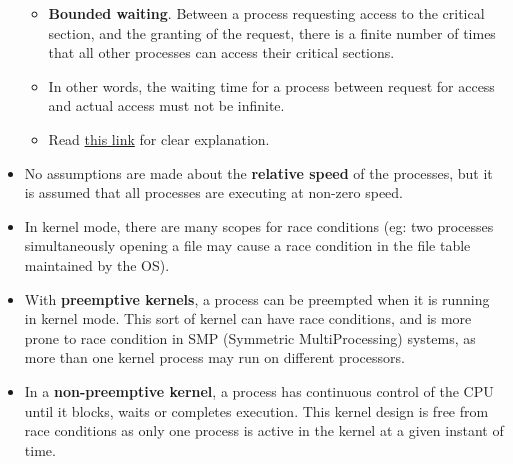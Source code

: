 \documentclass{article}
\theoremstyle{plain}
\theoremstyle{definition}
\begin{document}
\begin{itemize}
\begin{itemize}
        \item \textbf{Bounded waiting}. Between a process requesting access to the critical section, and the granting of the request, there is a finite number of times that all other processes can access their critical sections.
        
        \item In other words, the waiting time for a process between request for access and actual access must not be infinite. 
        
        \item Read \href{https://stackoverflow.com/questions/33143779/what-is-progress-and-bounded-waiting-in-critical-section/33409854#33409854}{this link} for clear explanation. 
    \end{itemize}
    
    \item No assumptions are made about the \textbf{relative speed} of the processes, but it is assumed that all processes are executing at non-zero speed. 
    
    \item In kernel mode, there are many scopes for race conditions (eg: two processes simultaneously opening a file may cause a race condition in the file table maintained by the OS). 
    
    \item With \textbf{preemptive kernels}, a process can be preempted when it is running in kernel mode. This sort of kernel can have race conditions, and is more prone to race condition in SMP (Symmetric MultiProcessing) systems, as more than one kernel process may run on different processors. 
    
    \item In a \textbf{non-preemptive kernel}, a process has continuous control of the CPU until it blocks, waits or completes execution. This kernel design is free from race conditions as only one process is active in the kernel at a given instant of time. 
\end{itemize}
\end{document}
